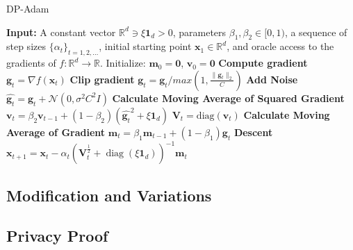 \begin{algorithm}
    \caption{DP-Adam}
    \label{alg:adam}
    \begin{algorithmic}[1]
        \State \textbf{Input:} A constant vector $\mathbb{R}^d \ni \xi \mathbf{1}_d > 0$, parameters $\beta_1, \beta_2 \in [0, 1)$, a sequence of step sizes $\{\alpha_t\}_{t=1,2,\dots}$, initial starting point $\mathbf{x}_1 \in \mathbb{R}^d$, and oracle access to the gradients of $f : \mathbb{R}^d \to \mathbb{R}$.
            \State Initialize: $\mathbf{m}_0 = \mathbf{0}$, $\mathbf{v}_0 = \mathbf{0}$
            \State \textbf{Compute gradient}
                \State $\mathbf{g}_t = \nabla f(\mathbf{x}_t)$
                \State \textbf{Clip gradient}
                \State $\mathbf{g}_t = \mathbf{g}_t/max(1, \frac{\lVert \mathbf{g}_t \rVert_{2} }{C})$
                \State \textbf{Add Noise}
                \State $\hat{\mathbf{g}_t} = \mathbf{g}_t + \mathcal{N}(0,\sigma^{2}C^{2}I)$
                \State \textbf{Calculate Moving Average of Squared Gradient}
                \State $\mathbf{v}_t = \beta_2 \mathbf{v}_{t-1} + (1 - \beta_2)(\hat{\mathbf{g}_t}^2 + \xi \mathbf{1}_d)$
                \State $\mathbf{V}_t = \text{diag}(\mathbf{v}_t)$
                \State \textbf{Calculate Moving Average of Gradient}
                \State $\mathbf{m}_t = \beta_1 \mathbf{m}_{t-1} + (1 - \beta_1) \hat{\mathbf{g}_t}$
                \State \textbf{Descent}
                \State $\mathbf{x}_{t+1} = \mathbf{x}_t - \alpha_t \left( \mathbf{V}_t^{\frac{1}{2}} + \operatorname{diag}(\xi \mathbf{1}_d) \right)^{-1} \mathbf{m}_t$

            \EndFor
        \EndFunction
    \end{algorithmic}
\end{algorithm}

\subsection{Modification and Variations}\label{subsec:modification-and-variations}


\subsection{Privacy Proof}\label{subsec:incremental-improvements}

